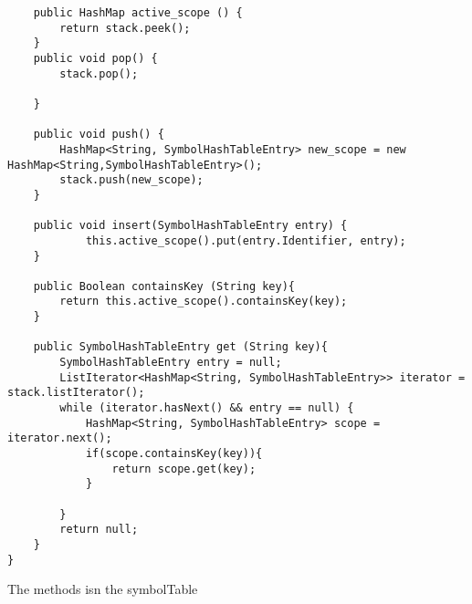 \begin{listing}[htb!]
    \begin{verbatim}
    public HashMap active_scope () {
        return stack.peek();
    }
    public void pop() {
        stack.pop();
        
    }

    public void push() {
        HashMap<String, SymbolHashTableEntry> new_scope = new HashMap<String,SymbolHashTableEntry>();
        stack.push(new_scope);
    }

    public void insert(SymbolHashTableEntry entry) {
            this.active_scope().put(entry.Identifier, entry);
    }

    public Boolean containsKey (String key){
        return this.active_scope().containsKey(key);
    }

    public SymbolHashTableEntry get (String key){
        SymbolHashTableEntry entry = null;
        ListIterator<HashMap<String, SymbolHashTableEntry>> iterator = stack.listIterator();
        while (iterator.hasNext() && entry == null) {
            HashMap<String, SymbolHashTableEntry> scope = iterator.next();
            if(scope.containsKey(key)){
                return scope.get(key);
            }
            
        }
        return null;   
    }   
}
\end{verbatim}
\caption{The methods isn the symbolTable}
\label{lst:SymboltableMethods}
\end{listing}